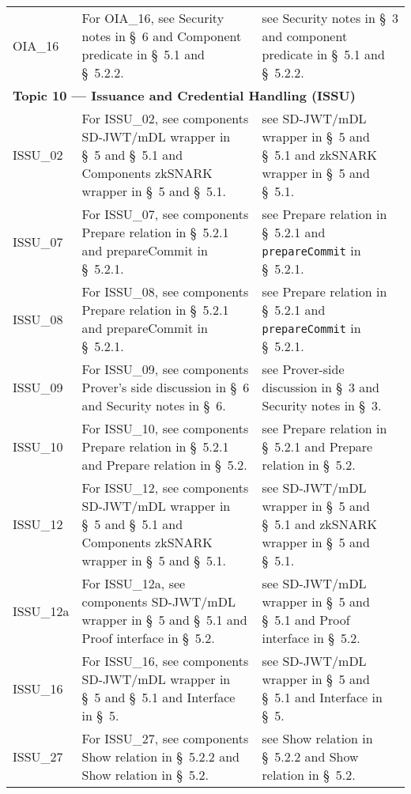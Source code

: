 \begin{landscape}
\begin{longtable}{p{3cm} p{10cm} p{7cm}}
OIA\_16 &
For OIA\_16, see Security notes in \S~6 and Component predicate in \S~5.1 and \S~5.2.2. &
see Security notes in \S~3 and component predicate in \S~5.1 and \S~5.2.2. \\[1em]

\multicolumn{3}{l}{\textbf{Topic 10 — Issuance and Credential Handling (ISSU)}}\\

ISSU\_02 &
For ISSU\_02, see components SD-JWT/mDL wrapper in \S~5 and \S~5.1 and Components zkSNARK wrapper in \S~5 and \S~5.1. &
see SD-JWT/mDL wrapper in \S~5 and \S~5.1 and zkSNARK wrapper in \S~5 and \S~5.1. \\

ISSU\_07 &
For ISSU\_07, see components Prepare relation in \S~5.2.1 and prepareCommit in \S~5.2.1. &
see Prepare relation in \S~5.2.1 and \texttt{prepareCommit} in \S~5.2.1. \\

ISSU\_08 &
For ISSU\_08, see components Prepare relation in \S~5.2.1 and prepareCommit in \S~5.2.1. &
see Prepare relation in \S~5.2.1 and \texttt{prepareCommit} in \S~5.2.1. \\

ISSU\_09 &
For ISSU\_09, see components Prover's side discussion in \S~6 and Security notes in \S~6. &
see Prover-side discussion in \S~3 and Security notes in \S~3. \\

ISSU\_10 &
For ISSU\_10, see components Prepare relation in \S~5.2.1 and Prepare relation in \S~5.2. &
see Prepare relation in \S~5.2.1 and Prepare relation in \S~5.2. \\

ISSU\_12 &
For ISSU\_12, see components SD-JWT/mDL wrapper in \S~5 and \S~5.1 and Components zkSNARK wrapper in \S~5 and \S~5.1. &
see SD-JWT/mDL wrapper in \S~5 and \S~5.1 and zkSNARK wrapper in \S~5 and \S~5.1. \\

ISSU\_12a &
For ISSU\_12a, see components SD-JWT/mDL wrapper in \S~5 and \S~5.1 and Proof interface in \S~5.2. &
see SD-JWT/mDL wrapper in \S~5 and \S~5.1 and Proof interface in \S~5.2. \\

ISSU\_16 &
For ISSU\_16, see components SD-JWT/mDL wrapper in \S~5 and \S~5.1 and Interface in \S~5. &
see SD-JWT/mDL wrapper in \S~5 and \S~5.1 and Interface in \S~5. \\

ISSU\_27 &
For ISSU\_27, see components Show relation in \S~5.2.2 and Show relation in \S~5.2. &
see Show relation in \S~5.2.2 and Show relation in \S~5.2. \\


\end{longtable}
\end{landscape}
